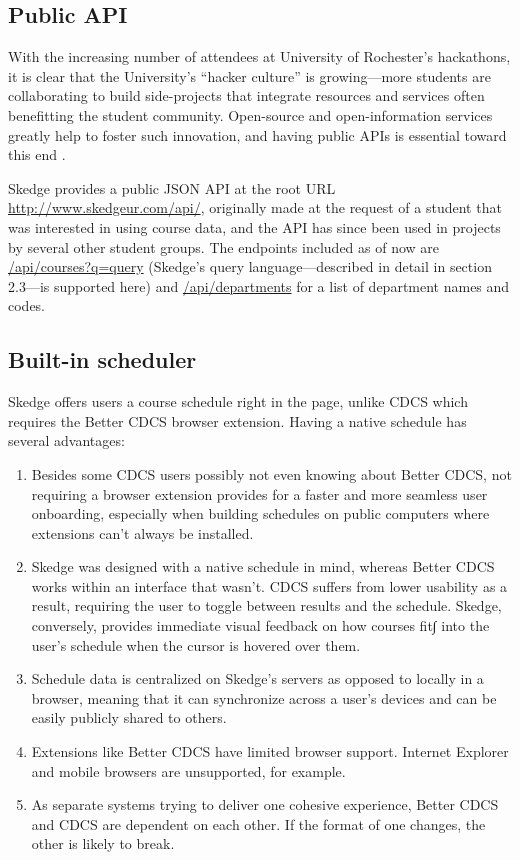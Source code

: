 \subsection{Public API}

With the increasing number of attendees at University of Rochester's hackathons, it is clear that the University's ``hacker culture'' is growing---more students are collaborating to build side-projects that integrate resources and services often benefitting the student community. Open-source and open-information services greatly help to foster such innovation, and having public APIs is essential toward this end \cite{Milberry} \cite{hackers}.

Skedge provides a public JSON API at the root URL \url{http://www.skedgeur.com/api/}, originally made at the request of a student that was interested in using course data, and the API has since been used in projects by several other student groups. The endpoints included as of now are \url{/api/courses?q=query} (Skedge's query language---described in detail in section 2.3---is supported here) and \url{/api/departments} for a list of department names and codes.

\subsection{Built-in scheduler}

Skedge offers users a course schedule right in the page, unlike CDCS which requires the Better CDCS browser extension. Having a native schedule has several advantages:

\begin{enumerate}
\item Besides some CDCS users possibly not even knowing about Better CDCS, not requiring a browser extension provides for a faster and more seamless user onboarding, especially when building schedules on public computers where extensions can't always be installed.

\item Skedge was designed with a native schedule in mind, whereas Better CDCS works within an interface that wasn't. CDCS suffers from lower usability as a result, requiring the user to toggle between results and the schedule. Skedge, conversely, provides immediate visual feedback on how courses fit∫ into the user's schedule when the cursor is hovered over them.

\item Schedule data is centralized on Skedge's servers as opposed to locally in a browser, meaning that it can synchronize across a user's devices and can be easily publicly shared to others.

\item Extensions like Better CDCS have limited browser support. Internet Explorer and mobile browsers are unsupported, for example.

\item As separate systems trying to deliver one cohesive experience, Better CDCS and CDCS are dependent on each other. If the format of one changes, the other is likely to break.
\end{enumerate}
